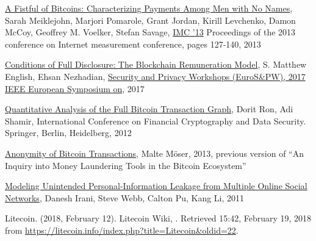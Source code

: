 \begin{thebibliography}{1}
\href{https://cseweb.ucsd.edu/~smeiklejohn/files/imc13.pdf}{A Fistful of
Bitcoins: Characterizing Payments Among Men with No Names}, Sarah Meiklejohn,
Marjori Pomarole, Grant Jordan, Kirill Levchenko, Damon McCoy, Geoffrey M.
Voelker, Stefan Savage, 
\href{http://www.sigcomm.org/events/imc-conference/}{IMC '13} Proceedings of
the 2013 conference on Internet measurement conference, pages 127-140, 2013

\href{http://ieeexplore.ieee.org/document/7966972/}{Conditions of Full
Disclosure: The Blockchain Remuneration Model}, S. Matthew English, 
Ehsan Nezhadian,
\href{http://ieeexplore.ieee.org/xpl/mostRecentIssue.jsp?punumber=7966454}
{Security and Privacy Workshops (EuroS\&PW), 2017 IEEE European Symposium on},
2017

\href{http://arimoto.lolipop.jp/584.pdf}{Quantitative Analysis of the Full
Bitcoin Transaction Graph}, Dorit Ron, Adi Shamir, International Conference on
Financial Cryptography and Data Security. Springer, Berlin, Heidelberg, 2012

\bibitem{}
\href{https://www.wi.uni-muenster.de/sites/wi/files/public/department/itsecurity/mbc13/mbc13-moeser-paper.pdf}
{Anonymity of Bitcoin Transactions}, Malte Möser, 2013, previous version of
``An Inquiry into Money Laundering Tools in the Bitcoin Ecosystem''

\href{https://www.cc.gatech.edu/projects/doi/Papers/DIrani_InternetComp_2011.pdf
}{Modeling Unintended Personal-Information Leakage from Multiple Online Social
Networks}, Danesh Irani, Steve Webb, Calton Pu, Kang Li, 2011

Litecoin. (2018, February 12). Litecoin Wiki, . Retrieved
15:42, February 19, 2018
from \url{https://litecoin.info/index.php?title=Litecoin&oldid=22}.

\end{thebibliography}

